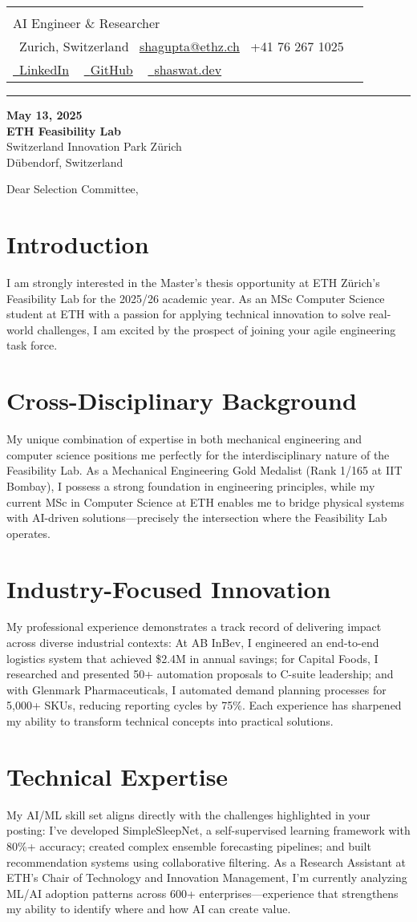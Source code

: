 \documentclass[letterpaper,10pt]{article}
\makeatletter
\newcommand{\icontext}[2]{\raisebox{-0.2\height}{#1}~#2}
\newcommand{\profileheader}{
  \vspace{8pt}
  \begin{tabularx}{\textwidth}{@{}l@{\hspace{1.1cm}}X@{}}
    \fcolorbox{accentblue}{white}{
      \texttt{[image: shaswat.png]}
    }
    &
    \begin{minipage}[b]{\linewidth}
      {\Huge \textcolor{accentblue}{\scshape Shaswat Gupta}} \\[3pt]
      {\large \textcolor{mutedtext}{AI Engineer \& Researcher}} \\[6pt]
      \icontext{\faMapMarker}{\textcolor{mutedtext}{Zurich, Switzerland}} \quad
      \icontext{\faEnvelope}{\href{mailto:shagupta@ethz.ch}{\textcolor{accentblue}{shagupta@ethz.ch}}} \quad
      \icontext{\faPhone}{\textcolor{accentblue}{+41 76 267 1025}} \\[5pt]
      \href{https://linkedin.com/in/shaswat-gupta/}{\icontext{\faLinkedin}{\textcolor{accentblue}{LinkedIn}}} ~
      \href{https://github.com/Shaswat-G}{\icontext{\faGithub}{\textcolor{accentblue}{GitHub}}} ~
      \href{https://shaswat.dev}{\icontext{\faGlobe}{\textcolor{accentblue}{shaswat.dev}}}
    \end{minipage}
  \end{tabularx}
  \vspace{6pt}
  \hrule height 1.2pt \color{bordercolor}
  \vspace{10pt}
}
\newcommand{\letterSection}[1]{
  \section*{#1}
  \vspace{-8pt}
}
\makeatother
\begin{document}
\profileheader

{\color{mutedtext}
\textbf{May 13, 2025} \\[1pt]
\textbf{ETH Feasibility Lab} \\
Switzerland Innovation Park Zürich \\
Dübendorf, Switzerland
}

\vspace{12pt}

{\color{headercolor}
Dear Selection Committee,
}

\vspace{2pt}

\letterSection{Introduction}
I am strongly interested in the Master's thesis opportunity at ETH Zürich's Feasibility Lab for the 2025/26 academic year. As an MSc Computer Science student at ETH with a passion for applying technical innovation to solve real-world challenges, I am excited by the prospect of joining your agile engineering task force.

\letterSection{Cross-Disciplinary Background}
My unique combination of expertise in both mechanical engineering and computer science positions me perfectly for the interdisciplinary nature of the Feasibility Lab. As a Mechanical Engineering Gold Medalist (Rank 1/165 at IIT Bombay), I possess a strong foundation in engineering principles, while my current MSc in Computer Science at ETH enables me to bridge physical systems with AI-driven solutions—precisely the intersection where the Feasibility Lab operates.

\letterSection{Industry-Focused Innovation}
My professional experience demonstrates a track record of delivering impact across diverse industrial contexts: At AB InBev, I engineered an end-to-end logistics system that achieved \$2.4M in annual savings; for Capital Foods, I researched and presented 50+ automation proposals to C-suite leadership; and with Glenmark Pharmaceuticals, I automated demand planning processes for 5,000+ SKUs, reducing reporting cycles by 75\%. Each experience has sharpened my ability to transform technical concepts into practical solutions.

\letterSection{Technical Expertise}
My AI/ML skill set aligns directly with the challenges highlighted in your posting: I've developed SimpleSleepNet, a self-supervised learning framework with 80\%+ accuracy; created complex ensemble forecasting pipelines; and built recommendation systems using collaborative filtering. As a Research Assistant at ETH's Chair of Technology and Innovation Management, I'm currently analyzing ML/AI adoption patterns across 600+ enterprises—experience that strengthens my ability to identify where and how AI can create value.
\end{document}
